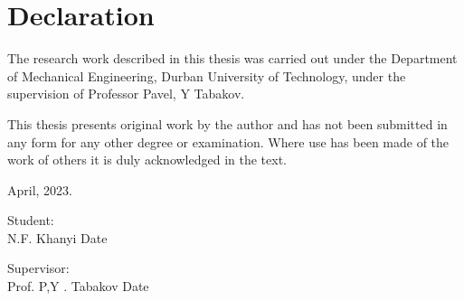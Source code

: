 \chapter{Declaration}
The research work described in this thesis was carried out under the Department of Mechanical Engineering, Durban University of Technology, under the supervision of Professor Pavel, Y Tabakov.   

This thesis presents original work by the author and has not been submitted in any form for any other degree or examination. Where use has been made of the work of others it is duly acknowledged in the text. \newline

\begin{flushright}
April, 2023.
\end{flushright} 

Student: \\
N.F. Khanyi	Date

Supervisor: \\
Prof. P,Y . Tabakov Date
